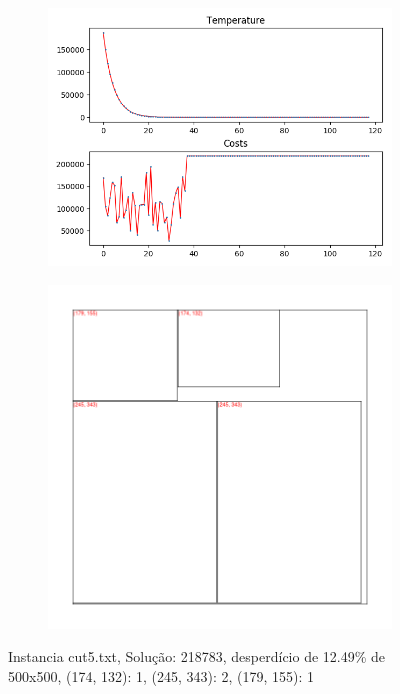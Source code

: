 \begin{figure}
\centering
\begin{subfigure}{.5\textwidth}
  \centering
  \includegraphics[width=1\linewidth]{results/cut5/3/plot}
  \label{fig:sub1}
\end{subfigure}%
\begin{subfigure}{.5\textwidth}
  \centering
  \includegraphics[width=1\linewidth]{results/cut5/3/cut}
  \label{fig:sub2}
\end{subfigure}
\caption{Instancia cut5.txt, Solução: 218783, desperdício de 12.49\% de 500x500, {(174, 132): 1, (245, 343): 2, (179, 155): 1}}
\label{fig:test}
\end{figure}


